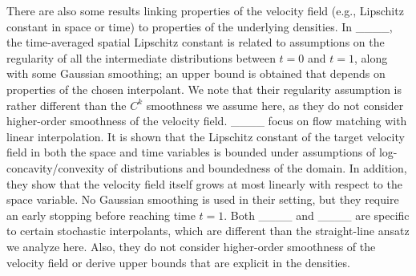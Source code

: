         


There are also some results linking properties of the velocity field (e.g., Lipschitz constant in space or time) to properties of the underlying densities. In ____, the time-averaged spatial Lipschitz constant is related to assumptions on the regularity of all the intermediate distributions between $t=0$ and $t=1$, along with some Gaussian smoothing; an upper bound is obtained that depends on properties of the chosen interpolant. We note that their regularity assumption is rather different than the $C^k$ smoothness we assume here, as they do not consider higher-order smoothness of the velocity field. ____ focus on flow matching with linear interpolation. It is shown that the Lipschitz constant of the target velocity field in both the space and time variables is bounded under assumptions of log-concavity/convexity of distributions and boundedness of the domain. In addition, they show that the velocity field itself grows at most linearly with respect to the space variable. No Gaussian smoothing is used in their setting, but they require an early stopping before reaching time $t = 1$. Both ____ and ____ are specific to certain stochastic interpolants, which are different than the straight-line ansatz we analyze here. Also, they do not consider higher-order smoothness of the velocity field or derive upper bounds that are explicit in the densities. 
    
